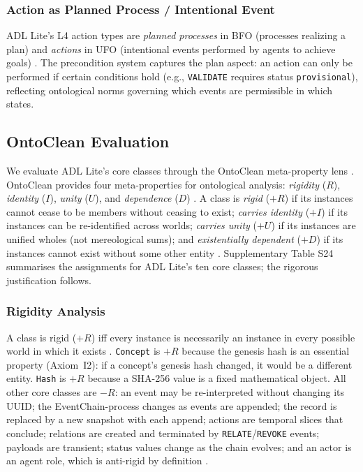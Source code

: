 \subsubsection{Action as Planned Process / Intentional Event}

ADL Lite's L4 action types are \emph{planned processes} in BFO (processes realizing a plan) \cite{bfo} and \emph{actions} in UFO (intentional events performed by agents to achieve goals) \cite{ufo}. The precondition system captures the plan aspect: an action can only be performed if certain conditions hold (e.g., \texttt{VALIDATE} requires status \texttt{provisional}), reflecting ontological norms governing which events are permissible in which states.

\subsection{OntoClean Evaluation}\label{subsec:ontoclean}

We evaluate ADL Lite's core classes through the OntoClean meta-property lens \cite{ontoclean,guarino2002evaluating,guarino2000identity}. OntoClean provides four meta-properties for ontological analysis: \emph{rigidity} ($R$), \emph{identity} ($I$), \emph{unity} ($U$), and \emph{dependence} ($D$) \cite{ontoclean}. A class is \emph{rigid} ($+R$) if its instances cannot cease to be members without ceasing to exist; \emph{carries identity} ($+I$) if its instances can be re-identified across worlds; \emph{carries unity} ($+U$) if its instances are unified wholes (not mereological sums); and \emph{existentially dependent} ($+D$) if its instances cannot exist without some other entity \cite{ontoclean,fine1995ontologicaldependence}. Supplementary Table S24 summarises the assignments for ADL Lite's ten core classes; the rigorous justification follows.

\subsubsection{Rigidity Analysis}\label{subsubsec:ontoclean-rigidity}

A class is rigid ($+R$) iff every instance is necessarily an instance in every possible world in which it exists \cite{ontoclean}. \texttt{Concept} is $+R$ because the genesis hash is an essential property (Axiom~I2): if a concept's genesis hash changed, it would be a different entity. \texttt{Hash} is $+R$ because a SHA-256 value is a fixed mathematical object. All other core classes are $-R$: an event may be re-interpreted without changing its UUID; the EventChain-process changes as events are appended; the record is replaced by a new snapshot with each append; actions are temporal slices that conclude; relations are created and terminated by \texttt{RELATE}/\texttt{REVOKE} events; payloads are transient; status values change as the chain evolves; and an actor is an agent role, which is anti-rigid by definition \cite{ontoclean}.

